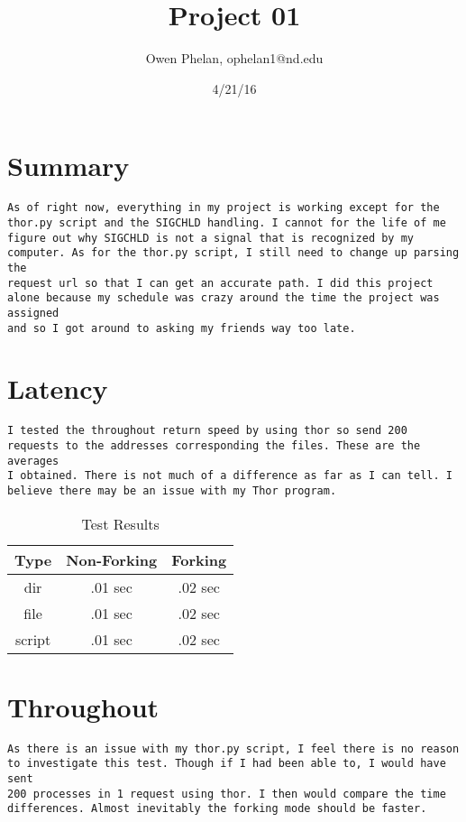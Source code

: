 \documentclass{article}
\title{Project 01}
\date{4/21/16}
\author{Owen Phelan, ophelan1@nd.edu}
\begin{document}
	\maketitle
	\section{Summary}
	\begin{verbatim}
As of right now, everything in my project is working except for the thor.py script and the SIGCHLD handling. I cannot for the life of me 
figure out why SIGCHLD is not a signal that is recognized by my computer. As for the thor.py script, I still need to change up parsing the 
request url so that I can get an accurate path. I did this project alone because my schedule was crazy around the time the project was assigned
and so I got around to asking my friends way too late.  

	\end{verbatim}
	\section{Latency}
	\begin{verbatim}
I tested the throughout return speed by using thor so send 200 requests to the addresses corresponding the files. These are the averages
I obtained. There is not much of a difference as far as I can tell. I believe there may be an issue with my Thor program.

	\end{verbatim}
	\begin{table}[h!]
	    \centering
	    \begin{tabular}{c|c|c}
	    Type	& 	 Non-Forking &  Forking\\
	    \hline
	    dir		& 	.01 sec 			& 	.02 sec	\\
	    file		& 	.01 sec 			& 	.02 sec	\\
	    script	& 	.01 sec			& 	.02 sec 	\\
	    \end{tabular}
	    \caption{Test Results}
	    \label{tbl:Data Results}
	\end{table}
	\section*{Throughout}
	\begin{verbatim}
As there is an issue with my thor.py script, I feel there is no reason to investigate this test. Though if I had been able to, I would have sent
200 processes in 1 request using thor. I then would compare the time differences. Almost inevitably the forking mode should be faster. 
	\end{verbatim}
\end{document}
